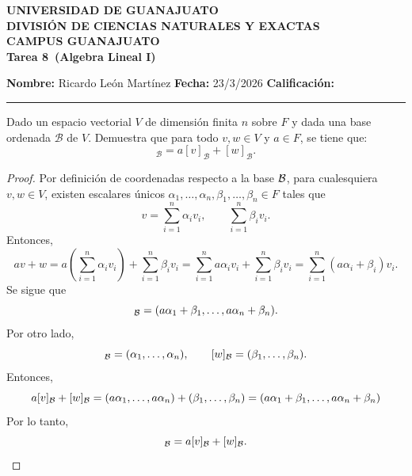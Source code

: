 \documentclass[12pt,a4paper]{article}
\newcommand{\paren}[1]{\left( #1 \right)}
\newcommand{\alumno}{Ricardo León Martínez}
\newcommand{\materia}{Algebra Lineal I}
\newcommand{\tarea}{Tarea 8}
\newcommand{\fecha}{23/3/2026}
\begin{document}
    \begin{center}
        {\large\textbf{UNIVERSIDAD DE GUANAJUATO}}\\[0.3cm]
        {\normalsize\textbf{DIVISIÓN DE CIENCIAS NATURALES Y EXACTAS}}\\
        {\normalsize\textbf{CAMPUS GUANAJUATO}}\\[1cm]

        {\Large\textbf{\tarea\ (\materia)}}\\[1cm]
    \end{center}

    \noindent
    \textbf{Nombre:} \alumno 
    \hfill 
    \textbf{Fecha:} \fecha 
    \hfill 
    \textbf{Calificación:} \rule{3cm}{0.4pt}

    \vspace{0.3cm}

    \begin{mdframed}[style=mdpinkbox,frametitle={Ejercicio 1}]
        Dado un espacio vectorial $V$ de dimensión finita $n$ sobre $F$ y dada una base ordenada $\mathcal{B}$ de $V$. Demuestra
        que para todo $v,w\in V$ y $a\in F$, se tiene que:
        \begin{equation*}
            [av+w]_{\mathcal{B}}=a[v]_{\mathcal{B}}+[w]_{\mathcal{B}}.
        \end{equation*}
    \end{mdframed}

    \begin{proof}
        Por definición de coordenadas respecto a la base $\mathcal{B}$, para cualesquiera $v,w\in V$, existen
        escalares únicos $\alpha_{1},\dots,\alpha_{n},\beta_{1},\dots,\beta_{n}\in F$ tales que
        \begin{equation*}
            v=\sum_{i=1}^{n}\alpha_{i}v_{i},\qquad\sum_{i=1}^{n}\beta_{i}v_{i}.
        \end{equation*}
        Entonces,
        \begin{equation*}
            av+w=a\paren{\sum_{i=1}^{n}\alpha_{i}v_{i}}+\sum_{i=1}^{n}\beta_{i}v_{i}=\sum_{i=1}^{n}a\alpha_{i}v_{i}+\sum_{i=1}^{n}\beta_{i}v_{i}=\sum_{i=1}^{n}(a\alpha_{i}+\beta_{i})v_{i}.
        \end{equation*}
        Se sigue que
        \begin{equation*}
            [av+w]_{\BB}=(a\alpha_{1}+\beta_{1},\dots,a\alpha_{n}+\beta_{n}).
        \end{equation*}
        Por otro lado,
        \begin{equation*}
            [v]_{\BB}=(\alpha_{1},\dots,\alpha_{n}),\qquad [w]_{\BB}=(\beta_{1},\dots,\beta_{n}).
        \end{equation*}
        Entonces,
        \begin{equation*}
            a[v]_{\mathcal{B}}+[w]_{\mathcal{B}}=(a\alpha_{1},\dots,a\alpha_{n})+(\beta_{1},\dots,\beta_{n})=(a\alpha_{1}+\beta_{1},\dots,a\alpha_{n}+\beta_{n})
        \end{equation*}
        Por lo tanto,
        \begin{equation*}
            [av+w]_{\BB}=a[v]_{\BB}+[w]_{\BB}.
        \end{equation*}
    \end{proof}
\end{document}
